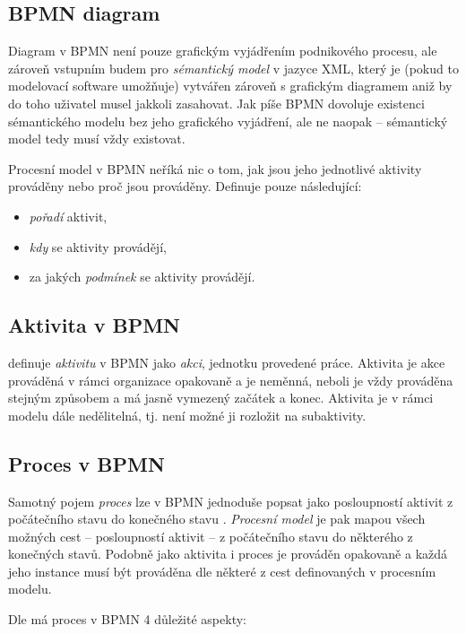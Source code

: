 \documentclass[]{article}
\begin{document}
\subsection{BPMN diagram}
Diagram v BPMN není pouze grafickým vyjádřením podnikového procesu, ale zároveň vstupním budem pro \textit{sémantický model} v jazyce XML, který je (pokud to modelovací software umožňuje) vytvářen zároveň s grafickým diagramem aniž by do toho uživatel musel jakkoli zasahovat. Jak píše \cite{Silver2011} BPMN dovoluje existenci sémantického modelu bez jeho grafického vyjádření, ale ne naopak – sémantický model tedy musí vždy existovat.

Procesní model v BPMN neříká nic o tom, jak jsou jeho jednotlivé aktivity prováděny nebo proč jsou prováděny. Definuje pouze následující:

\begin{itemize}
\item \textit{pořadí} aktivit,
\item \textit{kdy} se aktivity provádějí,
\item za jakých \textit{podmínek} se aktivity provádějí.
\end{itemize}

\subsection{Aktivita v BPMN}
\cite{Silver2011} definuje \textit{aktivitu} v BPMN jako \textit{akci}, jednotku provedené práce. Aktivita je akce prováděná v rámci organizace opakovaně a je neměnná, neboli je vždy prováděna stejným způsobem a má jasně vymezený začátek a konec. Aktivita je v rámci modelu dále nedělitelná, tj. není možné ji rozložit na subaktivity.

\subsection{Proces v BPMN}
Samotný pojem \textit{proces} lze v BPMN jednoduše popsat jako posloupností aktivit z počátečního stavu do konečného stavu \cite{Silver2011}. \textit{Procesní model} je pak mapou všech možných cest – posloupností aktivit – z počátečního stavu do některého z konečných stavů. Podobně jako aktivita i proces je prováděn opakovaně a každá jeho instance musí být prováděna dle některé z cest definovaných v procesním modelu.

Dle \cite{Silver2013} má proces v BPMN 4 důležité aspekty:
\end{document}
